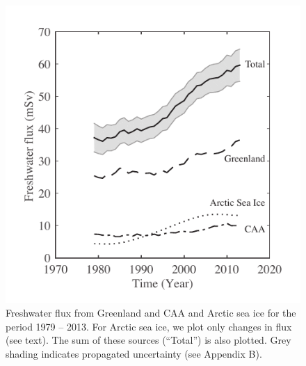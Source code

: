 \clearpage
\begin{figure}
	\centering
	\includegraphics{figs_chpt4/Fig4.pdf}	
	\caption[Freshwater flux from Greenland and CAA and Arctic sea ice for the period 1979 – 2013.]{Freshwater flux from Greenland and CAA and Arctic sea ice for the period 1979 – 2013.  For Arctic sea ice, we plot only changes in flux (see text). The sum of these sources (“Total”) is also plotted.  Grey shading indicates propagated uncertainty (see Appendix B).}
	\label{fig:chpt4_fig4}
\end{figure}

